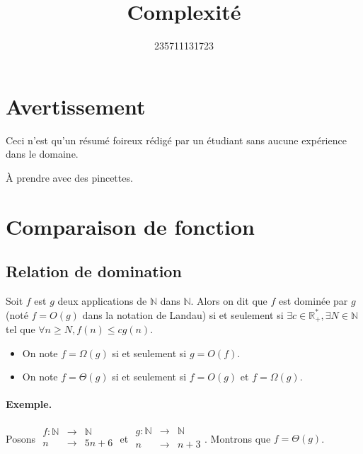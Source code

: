 \documentclass{article}
\title{Complexité}
\author{235711131723}
\begin{document}
    \maketitle

    \section{Avertissement}

    Ceci n'est qu'un résumé foireux rédigé par un étudiant sans aucune expérience dans le domaine.

    À prendre avec des pincettes. 

    \section{Comparaison de fonction}

    \subsection{Relation de domination}

    Soit $f$ est $g$ deux applications de $\mathbb{N}$ dans $\mathbb{N}$. Alors on dit que $f$ est dominée par $g$ (noté $f = O(g)$ dans la notation de Landau) si et seulement si $\exists c \in \mathbb{R^*_+}, \exists N \in \mathbb{N}$ tel que $\forall n \ge N, f(n) \le cg(n)$.\\

    \begin{itemize}
        \item On note $f = \Omega(g)$ si et seulement si $g = O(f)$.
        \item On note $f = \Theta(g)$ si et seulement si $f = O(g)$ et $f = \Omega(g)$.
    \end{itemize}

    \paragraph{Exemple.}

    Posons $\begin{array}{rcl}
        f : \mathbb{N} & \to & \mathbb{N}\\
        n & \to & 5n + 6\\
    \end{array}$
    et
    $\begin{array}{rcl}
        g : \mathbb{N} & \to & \mathbb{N}\\
        n & \to & n + 3\\
    \end{array}$. Montrons que $f = \Theta(g)$.
\end{document}
